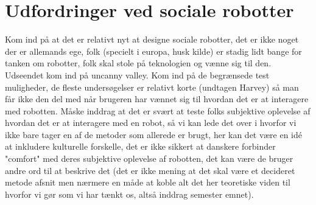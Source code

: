 \section{Udfordringer ved sociale robotter}
\label{UdfordringerSocialeRobotter}
%
Kom ind på at det er relativt nyt at designe sociale robotter, det er ikke noget der er allemands ege, folk (specielt i europa, husk kilde) er stadig lidt bange for tanken om robotter, folk skal stole på teknologien og vænne sig til den. Udseendet kom ind på uncanny valley. Kom ind på de begrænsede test muligheder, de fleste undersøgelser er relativt korte (undtagen Harvey) så man får ikke den del med når brugeren har vænnet sig til hvordan det er at interagere med robotten.  \blankline
%
Måske inddrag at det er svært at teste folks subjektive oplevelse af hvordan det er at interagere med en robot, så vi kan lede det over i hvorfor vi ikke bare tager en af de metoder som allerede er brugt, her kan det være en idé at inkludere kulturelle forskelle, det er ikke sikkert at danskere forbinder "comfort" med deres subjektive oplevelse af robotten, det kan være de bruger andre ord til at beskrive det (det er ikke mening at det skal være et decideret metode afsnit men nærmere en måde at koble alt det her teoretiske viden til hvorfor vi gør som vi har tænkt os, altså inddrag semester emnet).
